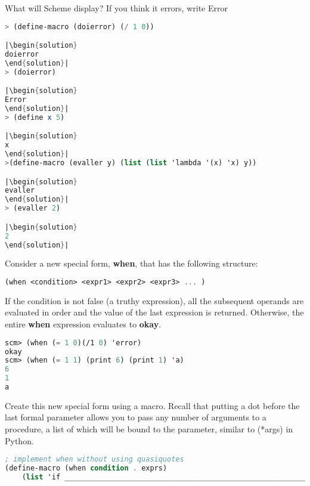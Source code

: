 \question
What will Scheme display? If you think it errors, write Error

\begin{lstlisting}[language=Scheme]
> (define-macro (doierror) (/ 1 0))

|\begin{solution}
doierror
\end{solution}|
> (doierror)

|\begin{solution}
Error
\end{solution}|
> (define x 5)

|\begin{solution}
x
\end{solution}|
>(define-macro (evaller y) (list (list 'lambda '(x) 'x) y))

|\begin{solution}
evaller
\end{solution}|
> (evaller 2)

|\begin{solution}
2
\end{solution}|
\end{lstlisting}

\question
Consider a new special form, \textbf{when}, that has the following structure: \\
\begin{lstlisting}[language=Scheme]
(when <condition> <expr1> <expr2> <expr3> ... )
\end{lstlisting}
If the condition is not false (a truthy expression), all the subsequent operands are evaluated in order and the value of the last expression is returned. Otherwise, the entire \textbf{when} expression evaluates to \textbf{okay}. 
\begin{lstlisting}[language=Scheme]
scm> (when (= 1 0)(/1 0) 'error)
okay
scm> (when (= 1 1) (print 6) (print 1) 'a)
6
1
a
\end{lstlisting}
Create this new special form using a macro. Recall that putting a dot before the last formal parameter allows you to pass any number of arguments to a procedure, a list of which will be bound to the parameter, similar to (*args) in Python. \\

\begin{lstlisting}[language=Scheme]
; implement when without using quasiquotes
(define-macro (when condition . exprs)
    (list 'if __________________________________________________________________________________)
\end{lstlisting}

